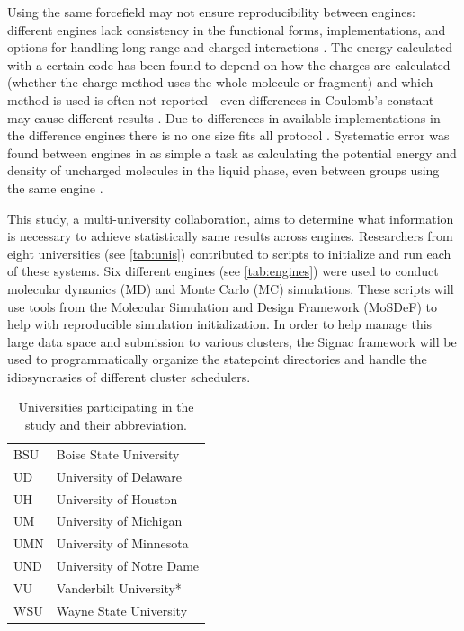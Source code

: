 Using the same forcefield may not ensure reproducibility between engines: different engines lack consistency in the functional forms, implementations, and options for handling long-range and charged interactions \citep{Rizzi2020}. 
The energy calculated with a certain code has been found to depend on how the charges are calculated (whether the charge method uses the whole molecule or fragment) and which method is used is often not reported---even differences in Coulomb's constant may cause different results \citep{Shirts2017}.
Due to differences in available implementations in the difference engines there is no one size fits all protocol \citep{Loeffler2018}.
Systematic error was found between engines in as simple a task as calculating the potential energy and density of uncharged molecules in the liquid phase, even between groups using the same engine \citep{Schappals2017}.

This study, a multi-university collaboration, aims to determine what information is necessary to achieve statistically same results across engines.
Researchers from eight universities (see \autoref{tab:unis}) contributed to scripts to initialize and run each of these systems.
Six different engines (see \autoref{tab:engines}) were used to conduct molecular dynamics (MD) and Monte Carlo (MC) simulations.
These scripts will use tools from the Molecular Simulation and Design Framework (MoSDeF) to help with reproducible simulation initialization.
In order to help manage this large data space and submission to various clusters, the Signac framework will be used to programmatically organize the statepoint directories and handle the idiosyncrasies of different cluster schedulers.

\begin{table}
\caption{Universities participating in the study and their abbreviation.}\label{tab:unis}
\centering
\begin{tabular}{ll}
BSU & Boise State University \\
UD & University of Delaware \\
UH & University of Houston \\
UM & University of Michigan \\
UMN & University of Minnesota \\
UND & University of Notre Dame \\
VU & Vanderbilt University* \\
WSU & Wayne State University
\end{tabular}
\end{table}

